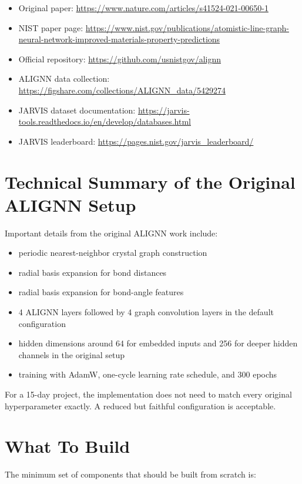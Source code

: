 \documentclass[12pt]{article}
\begin{document}
\begin{itemize}
    \item Original paper: \url{https://www.nature.com/articles/s41524-021-00650-1}
    \item NIST paper page: \url{https://www.nist.gov/publications/atomistic-line-graph-neural-network-improved-materials-property-predictions}
    \item Official repository: \url{https://github.com/usnistgov/alignn}
    \item ALIGNN data collection: \url{https://figshare.com/collections/ALIGNN_data/5429274}
    \item JARVIS dataset documentation: \url{https://jarvis-tools.readthedocs.io/en/develop/databases.html}
    \item JARVIS leaderboard: \url{https://pages.nist.gov/jarvis_leaderboard/}
\end{itemize}

\section{Technical Summary of the Original ALIGNN Setup}
Important details from the original ALIGNN work include:

\begin{itemize}
    \item periodic nearest-neighbor crystal graph construction
    \item radial basis expansion for bond distances
    \item radial basis expansion for bond-angle features
    \item 4 ALIGNN layers followed by 4 graph convolution layers in the default configuration
    \item hidden dimensions around 64 for embedded inputs and 256 for deeper hidden channels in the original setup
    \item training with AdamW, one-cycle learning rate schedule, and 300 epochs
\end{itemize}

For a 15-day project, the implementation does not need to match every original hyperparameter exactly. A reduced but faithful configuration is acceptable.

\section{What To Build}
The minimum set of components that should be built from scratch is:
\end{document}
